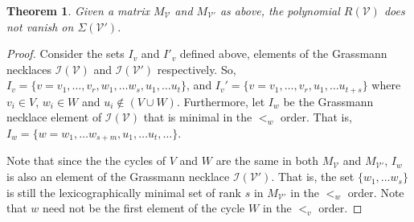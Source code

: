 \documentclass[11pt]{article}
\newcommand{\cV}{\mathcal{V}}
\newcommand{\cI}{\mathcal{I}}
\newtheorem{thm}{Theorem}[section]
\theoremstyle{remark}
\theoremstyle{definition}
\begin{document}
\begin{thm}
Given a matrix $M_{\cV}$ and $M_{\cV'}$ as above, the polynomial $R(\cV)$ does not vanish on $\Sigma(\cV')$. 
\end{thm} 

\begin{proof}
Consider the sets $I_v$ and $I'_v$ defined above, elements of the Grassmann necklaces $\cI(\cV)$ and $\cI(\cV')$ respectively. So, $I_v =  \{v = v_1, \ldots, v_r, w_1, \ldots w_s, u_1, \ldots u_t\}$, and $I_v' =  \{v = v_1, \ldots, v_r, u_1, \ldots u_{t+s}\}$ where $v_i \in V$, $w_i \in W$ and $u_i \not \in (V \cup W)$. Furthermore, let $I_w$ be the Grassmann necklace element of $\cI(\cV)$ that is minimal in the $<_w$ order. That is, $I_w =  \{ w = w_1, \ldots w_{s+m}, u_1, \ldots u_t, \ldots \}$. 

Note that since the the cycles of $V$ and $W$ are the same in both $M_{\cV}$ and $M_{\cV'}$, $I_w$ is also an element of the Grassmann necklace $\cI(\cV')$. That is, the set $\{ w_1, \ldots w_s\}$ is still the lexicographically minimal set of rank $s$ in $M_{\cV'}$ in the $<_w$ order. Note that $w$ need not be the first element of the cycle $W$ in the $<_v$ order. 


\end{proof}
\end{document}
